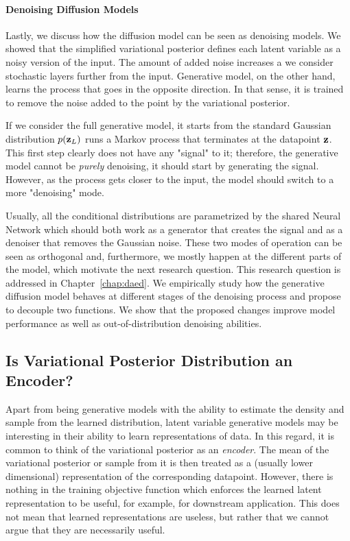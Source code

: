 \paragraph{Denoising Diffusion Models}
Lastly, we discuss how the diffusion model can be seen as denoising models. We showed that the simplified variational posterior defines each latent variable as a noisy version of the input. The amount of added noise increases a we consider stochastic layers further from the input. 
Generative model, on the other hand, learns the process that goes in the opposite direction. In that sense, it is trained to remove the noise added to the point by the variational posterior. 

If we consider the full generative model, it starts from the standard Gaussian distribution $p({\mathbf{z}}_L)$ runs a Markov process that terminates at the datapoint ${\mathbf{z}}$. This first step clearly does not have any "signal" to it; therefore, the generative model cannot be \textit{purely} denoising, it should start by generating the signal. However, as the process gets closer to the input, the model should switch to a more "denoising" mode. 

Usually, all the conditional distributions are parametrized by the shared Neural Network which should both work as a generator that creates the signal and as a denoiser that removes the Gaussian noise. These two modes of operation can be seen as orthogonal and, furthermore, we mostly happen at the different parts of the model, which motivate the next research question.
This research question is addressed in Chapter~\ref{chap:daed}. We empirically study how the generative diffusion model behaves at different stages of the denoising process and propose to decouple two functions. We show that the proposed changes improve model performance as well as out-of-distribution denoising abilities. 

\subsection{Is Variational Posterior Distribution an Encoder?}
Apart from being generative models with the ability to estimate the density and sample from the learned distribution, latent variable generative models may be interesting in their ability to learn representations of data. 
In this regard, it is common to think of the variational posterior as an \textit{encoder}. The mean of the variational posterior or sample from it is then treated as a (usually lower dimensional) representation of the corresponding datapoint. 
However, there is nothing in the training objective function which enforces the learned latent representation to be useful, for example, for downstream application. 
This does not mean that learned representations are useless, but rather that we cannot argue that they are necessarily useful. 

